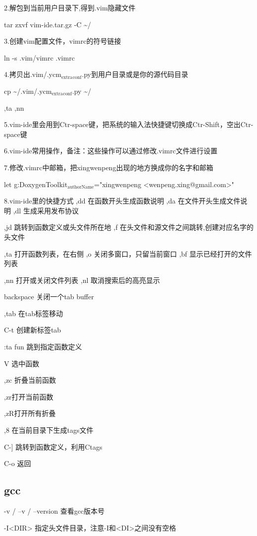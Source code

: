 \documentclass[11pt]{article}
\begin{document}
2.解包到当前用户目录下,得到.vim隐藏文件

tar zxvf vim-ide.tar.gz -C \textasciitilde{}/

3.创建vim配置文件，vimrc的符号链接

ln -s .vim/vimrc  .vimrc

4.拷贝出.vim/.ycm$_{\text{extra}}$$_{\text{conf}}$.py到用户目录或是你的源代码目录

cp \textasciitilde{}/.vim/.ycm$_{\text{extra}}$$_{\text{conf}}$.py  \textasciitilde{}/

,ta    ,nn

5.vim-ide里会用到Ctr-space键，把系统的输入法快捷键切换成Ctr-Shift，空出Ctr-space键

6.vim-ide常用操作，备注：这些操作可以通过修改.vimrc文件进行设置

7.修改.vimrc中邮箱，把xingwenpeng出现的地方换成你的名字和邮箱

let g:DoxygenToolkit$_{\text{authorName}}$="xingwenpeng <wenpeng.xing@gmail.com>"

8.vim-ide里的快捷方式
,dd     在函数开头生成函数说明
,da     在文件开头生成文件说明
,dl     生成采用发布协议

,jd        跳转到函数定义或头文件所在地
,f      在头文件和源文件之间跳转,创建对应名字的头文件

,ta     打开函数列表，在右侧
,o      关闭多窗口，只留当前窗口
,bf     显示已经打开的文件列表

,nn      打开或关闭文件列表
,nl    取消搜索后的高亮显示

backspace 关闭一个tab buffer

,tab    在tab标签移动

C-t    创建新标签tab


:ta fun    跳到指定函数定义

V 选中函数

,zc 折叠当前函数

,zr打开当前函数

,zR打开所有折叠

,8      在当前目录下生成tags文件 

C-]     跳转到函数定义，利用Ctags

C-o        返回

\subsection{gcc}
\label{sec-1-3}

-v / --v / --version 查看gcc版本号

-I<DIR> 指定头文件目录，注意-I和<DI>之间没有空格 
\end{document}
